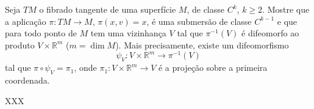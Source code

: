 \begin{homeworkProblem}
  Seja $TM$ o fibrado tangente de uma superfície $M$, de classe $C^k$, $k \geq 2$. Mostre que a aplicação $\pi : TM \to M$, $\pi(x,v)=x$, é uma submersão de classe $C^{k-1}$ e que para todo ponto de $M$ tem uma vizinhança $V$ tal que $\pi^{-1}(V)$ é difeomorfo ao produto $V \times \mathbb{R}^m$ ($m = \dim M$). Mais precisamente, existe um difeomorfismo
    \[
    \psi_V : V \times \mathbb{R}^m \to \pi^{-1}(V)
    \]
    tal que $\pi \circ \psi_V = \pi_1$, onde $\pi_1 : V \times \mathbb{R}^m \to V$ é a projeção sobre a primeira coordenada.
  \begin{solution}
    XXX  
  \end{solution}
\end{homeworkProblem}
